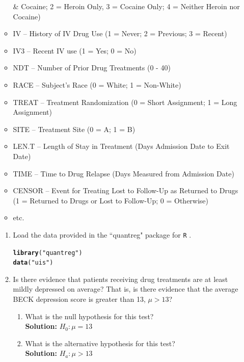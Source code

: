 \documentclass{article}\usepackage[]{graphicx}\usepackage[]{color}
\makeatletter
\newcommand{\hlstr}[1]{\textcolor[rgb]{0.192,0.494,0.8}{#1}}%
\newcommand{\hlstd}[1]{\textcolor[rgb]{0.345,0.345,0.345}{#1}}%
\newcommand{\hlkwd}[1]{\textcolor[rgb]{0.737,0.353,0.396}{\textbf{#1}}}%
\newenvironment{kframe}{%
 \def\at@end@of@kframe{}%
 \ifinner\ifhmode%
  \def\at@end@of@kframe{\end{minipage}}%
  \begin{minipage}{\columnwidth}%
 \fi\fi%
 \def\FrameCommand##1{\hskip\@totalleftmargin \hskip-\fboxsep
 \colorbox{shadecolor}{##1}\hskip-\fboxsep
     \hskip-\linewidth \hskip-\@totalleftmargin \hskip\columnwidth}%
 \MakeFramed {\advance\hsize-\width
   \@totalleftmargin\z@ \linewidth\hsize
   \@setminipage}}%
 {\par\unskip\endMakeFramed%
 \at@end@of@kframe}
\newenvironment{knitrout}{}{} %
\makeatother
\begin{document}
\begin{enumerate}
\begin{itemize}
    \& Cocaine; 2 = Heroin Only, 3 = Cocaine Only; 4 = Neither Heroin nor Cocaine)
    \item IV -- History of IV Drug Use	(1 = Never; 2 = Previous; 3 = Recent)
    \item IV3	-- Recent IV use	(1 = Yes; 0 = No)
    \item NDT -- Number of Prior Drug Treatments (0 - 40)
    \item RACE -- Subject's Race	(0 = White; 1 = Non-White)
\item TREAT -- Treatment Randomization (0 = Short Assignment;	1 = Long Assignment)
\item SITE -- Treatment Site (0 = A; 1 = B)
\item LEN.T	-- Length of Stay in Treatment (Days Admission Date to Exit Date)	
\item TIME -- Time to Drug Relapse (Days Measured from Admission Date)
\item CENSOR -- Event for Treating Lost to Follow-Up as Returned to Drugs 
(1 = Returned to Drugs or Lost to Follow-Up; 0 = Otherwise)
\item etc.
\end{itemize}
\begin{enumerate} %
\item Load the data provided in the ``quantreg" package for \texttt{R} \citep{quantreg}.
\begin{knitrout}
\color{fgcolor}\begin{kframe}
\begin{alltt}
\hlkwd{library}\hlstd{(}\hlstr{"quantreg"}\hlstd{)}
\hlkwd{data}\hlstd{(}\hlstr{"uis"}\hlstd{)}
\end{alltt}
\end{kframe}
\end{knitrout}
\item Is there evidence that patients receiving drug treatments are at least mildly depressed
on average? That is, is there evidence that the average BECK depression score is greater
than 13, $\mu>13$?
    \begin{enumerate}
      \item What is the null hypothesis for this test?\\
      \textbf{Solution:} $H_{0}: \mu=13$
      \item What is the alternative hypothesis for this test?\\
      \textbf{Solution:} $H_{a}: \mu>13$

\end{enumerate}
\end{enumerate}
\end{enumerate}
\end{document}
